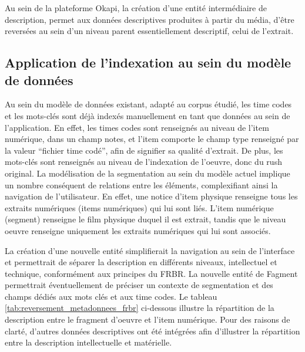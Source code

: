 Au sein de la plateforme Okapi, la création d'une entité intermédiaire de description, permet aux données descriptives produites à partir du média, d'être reversées au sein d'un niveau parent essentiellement descriptif, celui de l'extrait. 

\subsection{Application de l'indexation au sein du modèle de données}
Au sein du modèle de données existant, adapté au corpus étudié, les time codes et les mots-clés sont déjà indexés manuellement en tant que données au sein de l’application. En effet, les times codes sont renseignés au niveau de l'item numérique, dans un champ notes, et l'\gls{item} comporte le champ type renseigné par la valeur “fichier time codé”, afin de signifier sa qualité d'extrait. De plus, les mots-clés sont renseignés au niveau de l’indexation de l’\gls{oeuvre}, donc du \gls{rush} original. La modélisation de la segmentation au sein du modèle actuel implique un nombre conséquent de relations entre les éléments, complexifiant ainsi la navigation de l'utilisateur. En effet, une notice d'\gls{item} physique renseigne tous les extraits numériques (items numériques) qui lui sont liés. L’\gls{item} numérique (segment) renseigne le film physique duquel il est extrait, tandis que le niveau \gls{oeuvre} renseigne uniquement les extraits numériques qui lui sont associés. 

La création d’une nouvelle entité simplifierait la navigation au sein de l'interface et permettrait de séparer la description en différents niveaux, intellectuel et technique, conformément aux principes du \gls{FRBR}. La nouvelle entité de Fagment permettrait éventuellement de préciser un contexte de segmentation et des champs dédiés aux mots clés et aux time codes. Le tableau \ref{tab:reversement_metadonnees_frbr} ci-dessous illustre la répartition de la description entre le fragment d'\gls{oeuvre} et l'\gls{item} numérique. Pour des raisons de clarté, d'autres données descriptives ont été intégrées afin d'illustrer la répartition entre la description intellectuelle et matérielle. 


